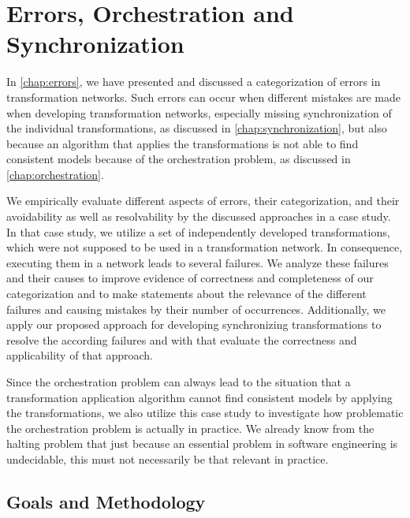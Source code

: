 \section{Errors, Orchestration and Synchronization}

In \autoref{chap:errors}, we have presented and discussed a categorization of errors in transformation networks.
Such errors can occur when different mistakes are made when developing transformation networks, especially missing synchronization of the individual transformations, as discussed in \autoref{chap:synchronization}, but also because an algorithm that applies the transformations is not able to find consistent models because of the orchestration problem, as discussed in \autoref{chap:orchestration}.

We empirically evaluate different aspects of errors, their categorization, and their avoidability as well as resolvability by the discussed approaches in a case study.
In that case study, we utilize a set of independently developed transformations, which were not supposed to be used in a transformation network.
In consequence, executing them in a network leads to several failures.
We analyze these failures and their causes to improve evidence of correctness and completeness of our categorization and to make statements about the relevance of the different failures and causing mistakes by their number of occurrences.
Additionally, we apply our proposed approach for developing synchronizing transformations to resolve the according failures and with that evaluate the correctness and applicability of that approach.

Since the orchestration problem can always lead to the situation that a transformation application algorithm cannot find consistent models by applying the transformations, we also utilize this case study to investigate how problematic the orchestration problem is actually in practice.
We already know from the halting problem that just because an essential problem in software engineering is undecidable, this must not necessarily be that relevant in practice.


\subsection{Goals and Methodology}

